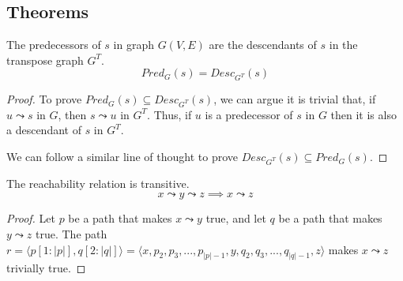 \subsection{Theorems}
\begin{theorem}
    The predecessors of $s$ in graph $G(V,E)$ are the descendants of $s$ in the transpose graph $G^T$.
    \begin{equation*}
        Pred_{G}(s)=Desc_{G^T}(s)
    \end{equation*}
\end{theorem}
\begin{proof}
    To prove $Pred_G(s) \subseteq Desc_{G^T}(s)$, we can argue it is trivial that, if $u \leadsto s$ in $G$, then $s \leadsto u$ in $G^T$. Thus, if $u$ is a predecessor of $s$ in $G$ then it is also a descendant of $s$ in $G^T$.\par
    We can follow a similar line of thought to prove $Desc_{G^T}(s) \subseteq Pred_G(s)$.
\end{proof}
\begin{theorem}
    The reachability relation is transitive.
    \begin{equation*}
        x \leadsto y \leadsto z \implies x \leadsto z
    \end{equation*}
\end{theorem}
\begin{proof}
Let $p$ be a path that makes $x \leadsto y$ true, and let $q$ be a path that makes $y \leadsto z$ true. The path $r = \langle p[1:|p|], q[2:|q|] \rangle = \langle x, p_2, p_3,...,p_{|p|-1},y,q_2,q_3,...,q_{|q|-1}, z \rangle$ makes $x \leadsto z$ trivially true.
\end{proof}
